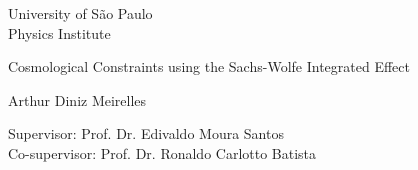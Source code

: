\begin{titlepage}
\pagestyle{empty}
\begin{center}

	{\fontsize{16}{16} \selectfont University of São Paulo \\}
	\vspace{0.1cm}
	{\fontsize{16}{16} \selectfont Physics Institute}
    \vspace{3.3cm}

	{\fontsize{22}{22}\selectfont Cosmological Constraints using the Sachs-Wolfe Integrated Effect \par}
    \vspace{2cm}


    {\fontsize{18}{18}\selectfont Arthur Diniz Meirelles \par}

    \vspace{2cm}

\end{center}

\leftskip 6cm
\begin{flushright}	
\leftskip 6cm
Supervisor: Prof. Dr.  Edivaldo Moura Santos \\
\leftskip 6cm
Co-supervisor: Prof. Dr. Ronaldo Carlotto Batista
\end{flushright}	

    \vspace{0.8cm}    


\par
\leftskip 6cm
\par
\leftskip 0cm
\vskip 2cm



\end{titlepage}
